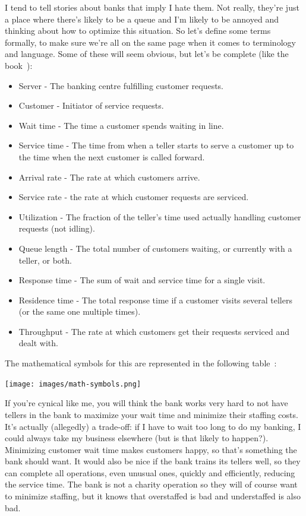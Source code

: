 \documentclass[a4paper]{report}
\begin{document}
I tend to tell stories about banks that imply I hate them. Not really, they're just a place where there's likely to be a queue and I'm likely to be annoyed and thinking about how to optimize this situation. So let's define some terms formally, to make sure we're all on the same page when it comes to terminology and language. Some of these will seem obvious, but let's be complete (like the book~\cite{swps}):

\begin{itemize}
	\item Server - The banking centre fulfilling customer requests.
	\item Customer - Initiator of service requests.
	\item Wait time - The time a customer spends waiting in line.
	\item Service time - The time from when a teller starts to serve a customer up to the time when the next customer is called forward.
	\item Arrival rate - The rate at which customers arrive.
	\item Service rate - the rate at which customer requests are serviced.
	\item Utilization - The fraction of the teller's time used actually handling customer requests (not idling).
	\item Queue length - The total number of customers waiting, or currently with a teller, or both.
	\item Response time - The sum of wait and service time for a single visit.
	\item Residence time - The total response time if a customer visits several tellers (or the same one multiple times).
	\item Throughput - The rate at which customers get their requests serviced and dealt with.
\end{itemize}

The mathematical symbols for this are represented in the following table~\cite{swps}:


\begin{center}
	\texttt{[image: images/math-symbols.png]}
\end{center}

If you're cynical like me, you will think the bank works very hard to not have tellers in the bank to maximize your wait time and minimize their staffing costs. It's actually (allegedly) a trade-off: if I have to wait too long to do my banking, I could always take my business elsewhere (but is that likely to happen?). Minimizing customer wait time makes customers happy, so that's something the bank should want. It would also be nice if the bank trains its tellers well, so they can complete all operations, even unusual ones, quickly and efficiently, reducing the service time. The bank is not a charity operation so they will of course want to minimize staffing, but it knows that overstaffed is bad and understaffed is also bad. 
\end{document}
